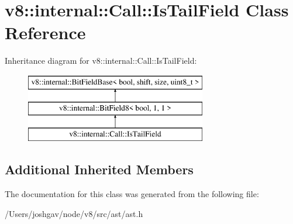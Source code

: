 \hypertarget{classv8_1_1internal_1_1_call_1_1_is_tail_field}{}\section{v8\+:\+:internal\+:\+:Call\+:\+:Is\+Tail\+Field Class Reference}
\label{classv8_1_1internal_1_1_call_1_1_is_tail_field}
Inheritance diagram for v8\+:\+:internal\+:\+:Call\+:\+:Is\+Tail\+Field\+:\begin{figure}[H]
\begin{center}
\leavevmode
\includegraphics[height=3.000000cm]{classv8_1_1internal_1_1_call_1_1_is_tail_field}
\end{center}
\end{figure}
\subsection*{Additional Inherited Members}


The documentation for this class was generated from the following file\+:\begin{DoxyCompactItemize}
\item 
/\+Users/joshgav/node/v8/src/ast/ast.\+h\end{DoxyCompactItemize}
